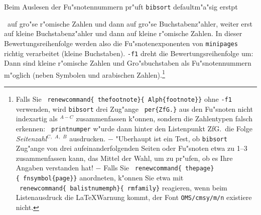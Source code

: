 \documentclass[12pt,a4paper]{article}
\newcommand{\pdfko}[1]{\kern #1pt
                          \strut\ignorespaces}%
\newcommand{\pbs}{\string\ \unskip}
\newcommand{\bs}{\protect\pbs}
\begin{document}
\vspace{.2ex}
Beim Auslesen der Fu"snotennummern pr"uft \verb|bibsort| defaultm"a"sig 
erst\pdfko{1.25}\  
auf gro"se r"omische Zahlen und dann auf gro"se Buchstabenz"ahler, weiter  
erst auf kleine Buchstabenz"ahler und dann auf kleine r"omische Zahlen. 
In dieser Bewertungsreihenfolge werden also die Fu"snotenexponenten
von \texttt{minipages} richtig verarbeitet (kleine Buchstaben). 
\ko\verb|-f1| dreht die Bewertungsreihenfolge um: Dann sind kleine r"omische Zahlen
und Gro"sbuchstaben als Fu"snotennummern m"oglich (neben Symbolen
und arabischen Zahlen).\footnote
{Falls Sie \texttt{\bs renewcommand\{\bs thefootnote\}\{\bs Alph\{footnote\}\}}
ohne \texttt{-f1} verwenden, wird \texttt{bibsort} 
drei Zug"ange \texttt{\bs per\{ZfG.\}} aus den Fu"snoten 
{\renewcommand{\thefootnote}{\Alph{footnote}}\footnotemark[1] \footnotemark[2] \footnotemark[3]}
nicht indexartig als $^{A-C}$ zusammenfassen k"onnen, sondern 
die Zahlentypen falsch erkennen: \texttt{\bs printnumper} w"urde
dann hinter den Listenpunkt ZfG.\ die Folge 
\textit{Seitenzahl}\kern1pt$^{C}$$^{,}$ $^{A}$$^{,}$ $^{B}$ ausdrucken.
$-$ "Uberhaupt ist ein Test, ob \texttt{bibsort} Zug"ange von drei 
aufeinanderfolgenden Seiten oder Fu"snoten 
etwa zu 1--3 zusammenfassen kann, das Mittel der Wahl, um zu pr"ufen, ob 
es Ihre Angaben verstanden hat! $-$ Falls Sie 
\texttt{\bs renewcommand\{\bs thepage\}\{\bs fnsymbol\{page\}\}}
anordneten, k"onnen Sie etwa mit 
\texttt{\bs renewcommand\{\bs balistnumemph\}\{\bs rmfamily\}} 
reagieren, wenn beim Listenausdruck die \LaTeX\hy Warnung kommt, 
der Font \texttt{OMS/cmsy/m/n} existiere nicht.}
\end{document}
